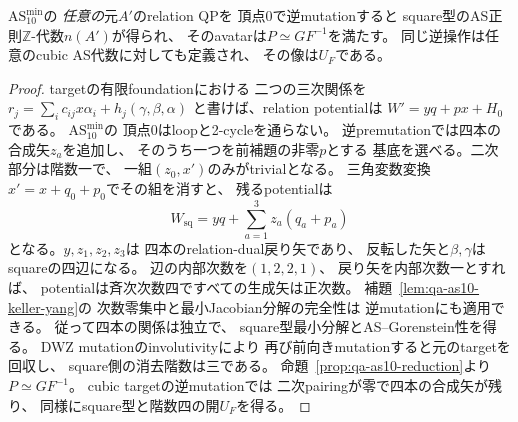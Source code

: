 \begin{theorem}[任意の最小十本矢targetからの逆構成]
\label{thm:qa-as10-inverse-all-targets}
$\mathrm{AS}_{10}^{\mathrm{min}}$の
\emph{任意の}元$A'$のrelation QPを
頂点0で逆mutationすると
square型のAS正則$\mathbb Z$-代数$n(A')$が得られ、
そのavatarは$P\simeq GF^{-1}$を満たす。
同じ逆操作は任意のcubic AS代数に対しても定義され、
その像は$U_F$である。
\end{theorem}
\begin{proof}
targetの有限foundationにおける
二つの三次関係を
$r_j=\sum_i c_{ij}x\alpha_i+h_j(\gamma,\beta,\alpha)$
と書けば、relation potentialは
$W'=yq+px+H_0$である。
$\mathrm{AS}_{10}^{\mathrm{min}}$の
頂点0はloopと2-cycleを通らない。
逆premutationでは四本の合成矢$z_a$を追加し、
そのうち一つを前補題の非零$p$とする
基底を選べる。二次部分は階数一で、
一組$(z_0,x')$のみがtrivialとなる。
三角変数変換
$x'=x+q_0+p_0$でその組を消すと、
残るpotentialは
\[
 W_{\mathrm{sq}}=
 yq+\sum_{a=1}^3z_a(q_a+p_a)
\]
となる。$y,z_1,z_2,z_3$は
四本のrelation-dual戻り矢であり、
反転した矢と$\beta,\gamma$はsquareの四辺になる。
辺の内部次数を$(1,2,2,1)$、
戻り矢を内部次数一とすれば、
potentialは斉次次数四ですべての生成矢は正次数。
補題~\ref{lem:qa-as10-keller-yang}の
次数零集中と最小Jacobian分解の完全性は
逆mutationにも適用できる。
従って四本の関係は独立で、
square型最小分解とAS--Gorenstein性を得る。
DWZ mutationのinvolutivityにより
再び前向きmutationすると元のtargetを回収し、
square側の消去階数は三である。
命題~\ref{prop:qa-as10-reduction}より
$P\simeq GF^{-1}$。
cubic targetの逆mutationでは
二次pairingが零で四本の合成矢が残り、
同様にsquare型と階数四の開$U_F$を得る。
\end{proof}

